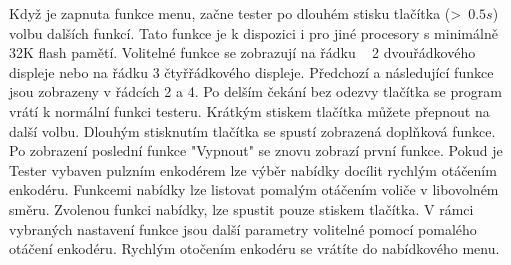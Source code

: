 Když je zapnuta funkce menu, začne tester po dlouhém stisku tlačítka (\textgreater~\(0.5s\)) volbu dalších funkcí.
Tato funkce je k dispozici i pro jiné procesory s minimálně 32K flash pamětí.
Volitelné funkce se zobrazují na řádku ~ 2 dvouřádkového displeje nebo na řádku 3 čtyřřádkového displeje.
Předchozí a následující funkce jsou zobrazeny v řádcích 2 a 4.
Po delším čekání bez odezvy tlačítka se program vrátí k normální funkci testeru.
Krátkým stiskem tlačítka můžete přepnout na další volbu.
Dlouhým stisknutím tlačítka se spustí zobrazená doplňková funkce.
Po zobrazení poslední funkce "Vypnout" se znovu zobrazí první funkce.
Pokud je Tester vybaven pulzním enkodérem lze výběr nabídky docílit rychlým otáčením enkodéru.
Funkcemi nabídky lze listovat pomalým otáčením voliče v libovolném směru.
Zvolenou funkci nabídky, lze spustit pouze stiskem tlačítka.
V rámci vybraných nastavení funkce jsou další parametry volitelné pomocí pomalého otáčení enkodéru.
Rychlým otočením enkodéru se vrátíte do nabídkového menu.

